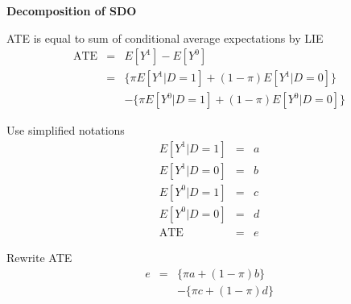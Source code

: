 \documentclass[notes=show]{beamer}
\begin{document}
\begin{frame}[shrink=20,plain]
	\begin{center}
	\textbf{Decomposition of SDO}
	\end{center} 

	\begin{block}{ATE is equal to sum of conditional average expectations by LIE}
	\begin{eqnarray*}
	  \text{ATE}&=&E[Y^1]-E[Y^0]  \\
	  &=& \{\pi E[Y^1 | D=1] + (1-\pi)E[Y^1 | D=0]\}  \\
	  & & - \{\pi E[Y^0|D=1] + (1-\pi) E[Y^0 | D=0]\} 
	\end{eqnarray*}
	\end{block}


	\begin{block}{Use simplified notations}
		\begin{eqnarray*}
		E[Y^1|D=1] &=& a  \\
		E[Y^1|D=0] &=& b  \\
		E[Y^0|D=1] &=& c  \\
		E[Y^0|D=0] &=& d  \\
		\text{ATE} &=& e 
		\end{eqnarray*}
	\end{block}

	\begin{block}{Rewrite ATE}
		\begin{eqnarray*}
		e&=&\{\pi{a} + (1-\pi)b\} \\
		&&- \{\pi{c} + (1-\pi)d\} 
		\end{eqnarray*}
	\end{block}
	
\end{frame}
\end{document}

